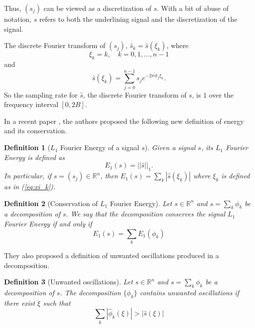 \documentclass{article}
\newtheorem{definition}{Definition}
\begin{document}
Thus, $(s_j)$ can be viewed as a discretization of $s$. With a bit of abuse of notation, $s$ refers to both the underlining signal and the discretization of the signal.

The discrete Fourier transform of $(s_j)$, $\hat{s}_k=\hat{s}(\xi_k)$, where
\begin{equation}
\xi_k=k, \quad k=0,1,\dots,n-1\label{eq:xi_k}
\end{equation}
and
\begin{equation}
\hat{s}(\xi_k)=\sum_{j=0}^{n-1}s_je^{-2{\pi}\hat i t_j{\xi}_k}.
\end{equation}
So the sampling rate for $\hat{s}$, the discrete Fourier transform of $s$, is $1$ over the frequency interval $[0,2B]$.

In a recent paper \cite{cicone2024new}, the authors proposed the following new definition of energy and its conservation.

\begin{definition}[$L_1$ Fourier Energy of a signal $s$]\label{def:L1_Energy}
Given a signal $s$, its $L_1$ \textit{Fourier Energy} is defined as
\begin{equation}\label{eq:L1_Energy}
E_{1}(s)=||\widehat{s}||_1.
\end{equation}
In particular, if $s=(s_j)\in\mathbb{R}^n$, then $E_1(s) =
\displaystyle{\sum_k |\widehat{s}(\xi_k)|}$ where $\xi_k$ is defined as in (\ref{eq:xi_k}).
\end{definition}

\begin{definition}[Conservation of $L_1$ Fourier Energy]\label{def:L1_Energy_cons}
Let $s\in\mathbb{R}^n$ and $s=\sum_k \phi_k$ be a decomposition of $s$. We say that the decomposition conserves the signal $L_1$ Fourier Energy if and only if
\begin{equation}\label{eq:Conservation_L1_Energy}
E_{1}(s)=\sum_k E_{1}(\phi_k)
\end{equation}
\end{definition}

They also proposed a definition of unwanted oscillations produced in a decomposition.

\begin{definition}[Unwanted oscillations] \label{def:Unwanted_oscillations}
Let $s\in\mathbb{R}^n$ and $s=\sum_k \phi_k$ be a decomposition of $s$. The decomposition $\{\phi_k\}$ contains unwanted oscillations if there exist $\xi$ such that
\begin{equation}\label{eq:Unwanted_oscillations}
    \sum_k \left|\widehat{\phi}_k(\xi)\right| > \left|\widehat{s}(\xi)\right|
\end{equation}
\end{definition}
\end{document}
